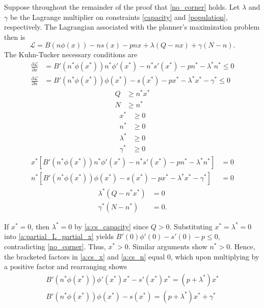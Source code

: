 \documentclass[12pt]{article}
\newcommand{\efficacy}{\phi}
\newcommand{\side}{s}
\newcommand{\benefit}{B}
\newcommand{\lagrangian}{\mathscr{L}}
\begin{document}
Suppose throughout the remainder of the proof that \eqref{no_corner} holds. Let $\lambda$ and $\gamma$ be the Lagrange multiplier on constraints \eqref{capacity} and \eqref{population}, respectively. The Lagrangian associated with the planner's maximization problem then is
\begin{equation}
\label{a:Lagrangian}
\lagrangian = B(n \efficacy(x)) - n\side(x) - p n x + \lambda(Q - nx) + \gamma(N - n).
\end{equation}
The Kuhn-Tucker necessary conditions are
\begin{align}
\frac{\partial \lagrangian}{\partial x} & = \benefit'(n^* \efficacy(x^*)) n^* \efficacy'(x^*) - n^* \side'(x^*) - p n^* - \lambda^* n^* \leq 0 \label{a:partial_L_partial_x} \\
\frac{\partial \lagrangian}{\partial n} & = \benefit'(n^* \efficacy(x^*)) \efficacy(x^*) - \side(x^*) - p x^* - \lambda^* x^* - \gamma^* \leq 0 \label{a:partial_L_partial_n}
\end{align}
\begin{align}
Q & \geq n^* x^*  \label{a:KT_capacity} \\
N & \geq n^*  \label{a:KT_population}
\end{align}
\begin{align}
x^* & \geq 0 \label{a:pos_x} \\
n^* & \geq 0 \label{a:pos_n}
\end{align}
\begin{align}
\lambda^* & \geq 0 \label{a:lambda} \\
\gamma^* & \geq 0 \label{a:gamma}
\end{align}
\begin{align}
x^* \left[ \benefit'(n^* \efficacy(x^*)) n^* \efficacy'(x^*) - n^* \side'(x^*) - p n^* - \lambda^* n^* \right] & = 0 \label{a:cs_x} \\
n^* \left[ \benefit'(n^* \efficacy(x^*)) \efficacy(x^*) - \side(x^*) - p x^* - \lambda^* x^* - \gamma^* \right] & = 0 \label{a:cs_n}
\end{align}
\begin{align}
\lambda^* (Q - n^* x^*) & = 0 \label{a:cs_capacity} \\
\gamma^* (N - n^*) & = 0. \label{a:cs_population}
\end{align}

If $x^* = 0$, then $\lambda^* = 0$ by \eqref{a:cs_capacity} since $Q > 0$. Substituting $x^* = \lambda^* = 0$ into \eqref{a:partial_L_partial_x} yields $\benefit'(0)\efficacy'(0) - \side'(0) - p \leq 0$, contradicting \eqref{no_corner}. Thus, $x^* > 0$. Similar arguments show $n^* > 0$. Hence, the bracketed factors in \eqref{a:cs_x} and \eqref{a:cs_n} equal 0, which upon multiplying by a positive factor and rearranging shows 
\begin{gather}
\benefit'(n^* \efficacy(x^*)) \efficacy'(x^*) x^* - \side'(x^*) x^* = (p + \lambda^*) x^* \label{a:foc_x} \\
\benefit'(n^* \efficacy(x^*)) \efficacy(x^*) - \side(x^*) = (p + \lambda^*) x^* + \gamma^* \label{a:foc_n}
\end{gather}
\end{document}
